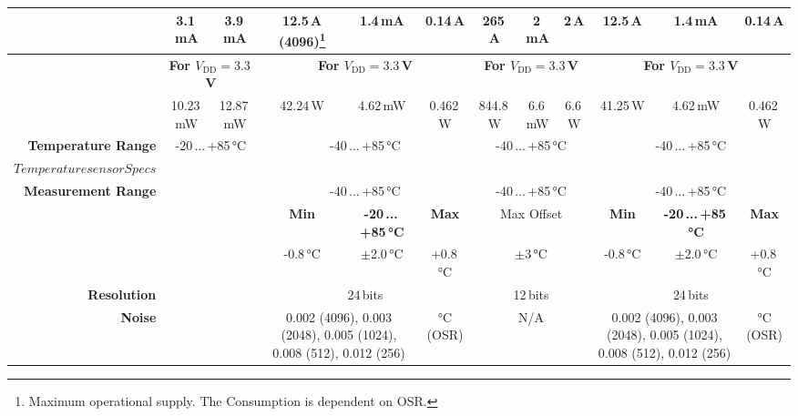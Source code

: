\documentclass[fontsize=11pt,%
twoside,%
BCOR          = 8mm, %
DIV           = 11,  %
titlepage     = off,%
index=totoc,%
xcolor        = pdftex,%
dvipsnames,%
bibliography  = totoc,%
bibliography = numbered, %
listof        = notnumbered]{scrreprt}
\begin{document}
\begin{table}
\begin{adjustbox}{width=1.05\textwidth}
\begin{tabular}{|r||c|c|c||c|c|c||c|c|c||c|c|c|}
			& 3.1\,mA & \multicolumn{2}{c||}{3.9\,mA} & 12.5\,\textmu A (4096)\footnote[5]{Maximum operational supply. The Consumption is dependent on OSR.\label{note:current_OSR}} & 1.4\,mA & 0.14\,\textmu A & 265\,\textmu A\footref{note:current_OSR} & 2\,mA & 2\,\textmu A & 12.5\,\textmu A\footref{note:current_OSR} & 1.4\,mA & 0.14\,\textmu A \\ \hline
			
			\multirowcell{2}{\textbf{Power Consumption}} & \multicolumn{3}{c||}{\textbf{For $V_\text{DD} = 3.3\,$V}} & \multicolumn{3}{c||}{\textbf{For $V_\text{DD} = 3.3\,$V}} & \multicolumn{3}{c||}{\textbf{For $V_\text{DD} = 3.3\,$V}} & \multicolumn{3}{c|}{\textbf{For $V_\text{DD} = 3.3\,$V}} \\ \cline{2-13}
			
			& 10.23\,mW & \multicolumn{2}{c||}{12.87\,mW} & 42.24\,\textmu W & 4.62\,mW & 0.462\,\textmu W & 844.8\,\textmu W & 6.6\,mW & 6.6\,\textmu W & 41.25\,\textmu W & 4.62\,mW & 0.462\,\textmu W\\ \hline
			
			\textbf{Temperature Range} & \multicolumn{3}{c||}{-20\,...\,+85\,°C} & \multicolumn{3}{c||}{-40\,...\,+85\,°C} & \multicolumn{3}{c||}{-40\,...\,+85\,°C} & \multicolumn{3}{c|}{-40\,...\,+85\,°C}\\ \hline \hline
			
			\rowcolor{light grey} $Temperature sensor Specs$ & \multicolumn{12}{c|}{} \\ \hline \hline
			
			\textbf{Measurement Range} & \multicolumn{3}{c||}{} & \multicolumn{3}{c||}{-40\,...\,+85\,°C} & \multicolumn{3}{c||}{-40\,...\,+85\,°C} & \multicolumn{3}{c|}{-40\,...\,+85\,°C} \\ \cline{5-13}
			
			\multirowcell{2}{\textbf{Accuracy}} & \multicolumn{3}{c||}{} & \textbf{Min} & \textbf{-20\,...\,+85\,°C} & \textbf{Max} & \multicolumn{3}{c||}{Max Offset} & \textbf{Min} & \textbf{-20\,...\,+85\,°C} & \textbf{Max} \\ \cline{5-13}
			
			& \multicolumn{3}{c||}{} & -0.8\,°C & $\pm$2.0\,°C & +0.8\,°C & \multicolumn{3}{c||}{$\pm$3\,°C} & -0.8\,°C & $\pm$2.0\,°C & +0.8\,°C \\ \cline{5-13}
			
			\textbf{Resolution} & \multicolumn{3}{c||}{} & \multicolumn{3}{c||}{24\,bits} & \multicolumn{3}{c||}{12\,bits} & \multicolumn{3}{c|}{24\,bits} \\ \cline{5-13}
			
			\textbf{Noise} & \multicolumn{3}{c||}{} & \multicolumn{2}{c|}{0.002 (4096), 0.003 (2048), 0.005 (1024), 0.008 (512), 0.012 (256)} & °C (OSR) & \multicolumn{3}{c||}{N/A} & \multicolumn{2}{c|}{0.002 (4096), 0.003 (2048), 0.005 (1024), 0.008 (512), 0.012 (256)} & °C (OSR) \\ \hline			
		\end{tabular}
	\end{adjustbox}
\end{table}
\end{document}
